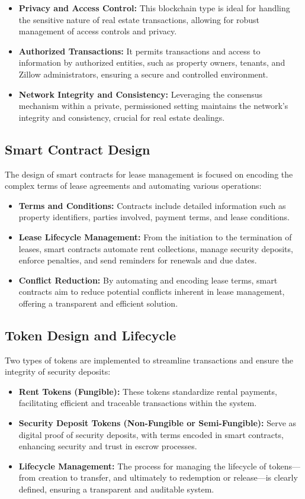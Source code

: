 \documentclass{article}
\begin{document}
\begin{itemize}
    \item \textbf{Privacy and Access Control:} This blockchain type is ideal for handling the sensitive nature of real estate transactions, allowing for robust management of access controls and privacy.
    \item \textbf{Authorized Transactions:} It permits transactions and access to information by authorized entities, such as property owners, tenants, and Zillow administrators, ensuring a secure and controlled environment.
    \item \textbf{Network Integrity and Consistency:} Leveraging the consensus mechanism within a private, permissioned setting maintains the network's integrity and consistency, crucial for real estate dealings.
\end{itemize}

\subsection{Smart Contract Design}
The design of smart contracts for lease management is focused on encoding the complex terms of lease agreements and automating various operations:

\begin{itemize}
    \item \textbf{Terms and Conditions:} Contracts include detailed information such as property identifiers, parties involved, payment terms, and lease conditions.
    \item \textbf{Lease Lifecycle Management:} From the initiation to the termination of leases, smart contracts automate rent collections, manage security deposits, enforce penalties, and send reminders for renewals and due dates.
    \item \textbf{Conflict Reduction:} By automating and encoding lease terms, smart contracts aim to reduce potential conflicts inherent in lease management, offering a transparent and efficient solution.
\end{itemize}

\subsection{Token Design and Lifecycle}
Two types of tokens are implemented to streamline transactions and ensure the integrity of security deposits:

\begin{itemize}
    \item \textbf{Rent Tokens (Fungible):} These tokens standardize rental payments, facilitating efficient and traceable transactions within the system.
    \item \textbf{Security Deposit Tokens (Non-Fungible or Semi-Fungible):} Serve as digital proof of security deposits, with terms encoded in smart contracts, enhancing security and trust in escrow processes.
    \item \textbf{Lifecycle Management:} The process for managing the lifecycle of tokens—from creation to transfer, and ultimately to redemption or release—is clearly defined, ensuring a transparent and auditable system.
\end{itemize}
\end{document}
